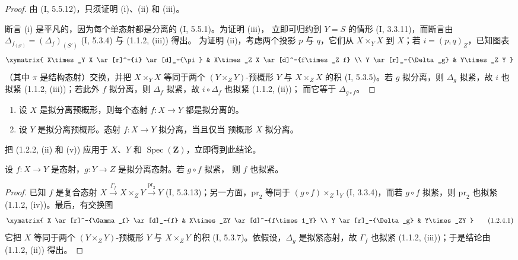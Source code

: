 \begin{proof}
由 (I, 5.5.12)，只须证明 (i)、(ii) 和 (iii)。

断言 (i) 是平凡的，因为每个单态射都是分离的 (I, 5.5.1)。为证明 (iii)，
立即可归约到 $Y=S$ 的情形 (I, 3.3.11)，而断言由
$\Delta_{f_{(S')}}=(\Delta_f)_{(S')}$ (I, 5.3.4) 与 (1.1.2, (iii)) 得出。
为证明 (ii)，考虑两个投影 $p$ 与 $q$，它们从 $X\times_Y X$ 到 $X$；若
$i=(p,q)_Z$，已知图表
\[
\xymatrix{
  X\times_Y X \ar[r]^-{i} \ar[d]_-{\pi} & X\times_Z X
    \ar[d]^-{f\times_Z f} \\
  Y \ar[r]_-{\Delta_g} & Y\times_Z Y
}
\]
（其中 $\pi$ 是结构态射）交换，并把 $X\times_Y X$ 等同于两个
$(Y\times_Z Y)$-预概形 $Y$ 与 $X\times_Z X$ 的积 (I, 5.3.5)。若 $g$
拟分离，则 $\Delta_g$ 拟紧，故 $i$ 也拟紧 (1.1.2, (iii))；若此外 $f$
拟分离，则 $\Delta_f$ 拟紧，故 $i\circ\Delta_f$ 也拟紧 (1.1.2, (ii))；
而它等于 $\Delta_{g\circ f}$。
\end{proof}

\begin{corollary}[1.2.3]
\label{IV.1.2.3-fr}
\begin{enumerate}
  \item[(i)] 设 $X$ 是拟分离预概形，则每个态射 $f:X\to Y$ 都是拟分离的。
  \item[(ii)] 设 $Y$ 是拟分离预概形。态射 $f:X\to Y$ 拟分离，当且仅当
  预概形 $X$ 拟分离。
\end{enumerate}
\end{corollary}

把 (1.2.2, (ii) 和 (v)) 应用于 $X$、$Y$ 和
$\operatorname{Spec}(\mathbf Z)$，立即得到此结论。

\begin{proposition}[1.2.4]
\label{IV.1.2.4-fr}
设 $f:X\to Y$ 是态射，$g:Y\to Z$ 是拟分离态射。若 $g\circ f$ 拟紧，
则 $f$ 也拟紧。
\end{proposition}

\begin{proof}
已知 $f$ 是复合态射
$X\xrightarrow{\Gamma_f}X\times_ZY\xrightarrow{\mathrm{pr}_2}Y$
(I, 5.3.13)；另一方面，$\mathrm{pr}_2$ 等同于
$(g\circ f)\times_Z1_Y$ (I, 3.3.4)，而若 $g\circ f$ 拟紧，则
$\mathrm{pr}_2$ 也拟紧 (1.1.2, (iv))。最后，有交换图
\[
\xymatrix{
  X \ar[r]^-{\Gamma_f} \ar[d]_-{f} & X\times_ZY
    \ar[d]^-{f\times 1_Y} \\
  Y \ar[r]_-{\Delta_g} & Y\times_ZY
}
\tag{1.2.4.1}
\label{IV.1.2.4.1-fr}
\]
它把 $X$ 等同于两个 $(Y\times_ZY)$-预概形 $Y$ 与 $X\times_ZY$ 的积
(I, 5.3.7)。依假设，$\Delta_g$ 是拟紧态射，故 $\Gamma_f$ 也拟紧
(1.1.2, (iii))；于是结论由 (1.1.2, (ii)) 得出。
\end{proof}

